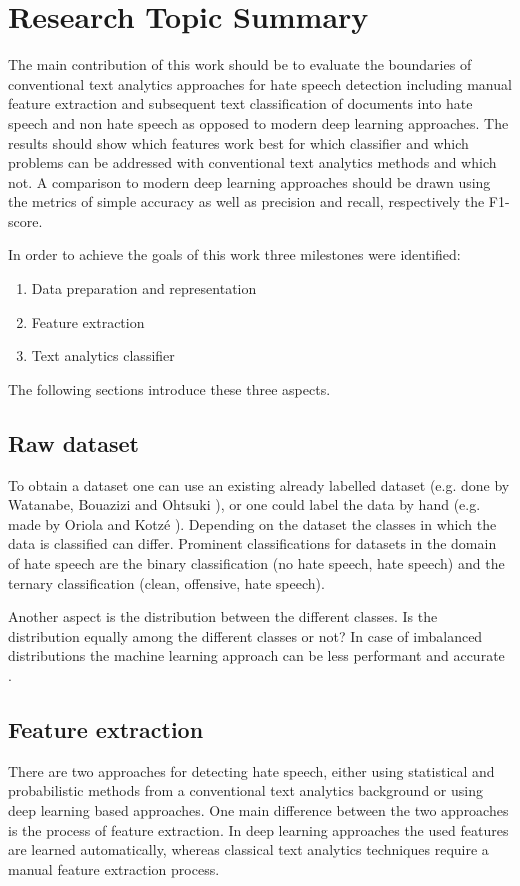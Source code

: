 \section{Research Topic Summary}

The main contribution of this work should be to evaluate the boundaries of conventional text analytics approaches for hate speech detection including manual feature extraction and subsequent text classification of documents into hate speech and non hate speech as opposed to modern deep learning approaches. The results should show which features work best for which classifier and which problems can be addressed with conventional text analytics methods and which not. A comparison to modern deep learning approaches should be drawn using the metrics of simple accuracy as well as precision and recall, respectively the F1-score. 

\newpage
\noindent
In order to achieve the goals of this work three milestones were identified: 

\begin{enumerate}
	\item Data preparation and representation
	\item Feature extraction
	\item Text analytics classifier
\end{enumerate}

\noindent
The following sections introduce these three aspects.

\subsection{Raw dataset}
To obtain a dataset one can use an existing already labelled dataset (e.g. done by Watanabe, Bouazizi and Ohtsuki \cite{Watanabe.2018}), or one could label the data by hand (e.g. made by Oriola and Kotz\'{e} \cite{Oriola.2020}).
Depending on the dataset the classes in which the data is classified can differ. Prominent classifications for datasets in the domain of hate speech are the binary classification (no hate speech, hate speech) and the ternary classification (clean, offensive, hate speech). 

Another aspect is the distribution between the different classes. Is the distribution equally among the different classes or not? In case of imbalanced distributions the machine learning approach can be less performant and accurate \cite{Oriola.2020}.


\subsection{Feature extraction}
There are two approaches for detecting hate speech, either using statistical and probabilistic methods from a conventional text analytics background or using deep learning based approaches. One main difference between the two approaches is the process of feature extraction. In deep learning approaches the used features are learned automatically, whereas classical text analytics techniques require a manual feature extraction process.

